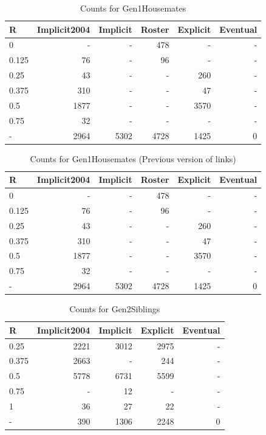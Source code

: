 \documentclass[a4paper]{article}\usepackage{graphicx, color}
\begin{document}
\begin{table}[ht]
\begin{center}
{\large
\begin{tabular}{lrrrrr}
  \hline
R & Implicit2004 & Implicit & Roster & Explicit & Eventual \\ 
  \hline
0 & - & - & 478 & - & - \\ 
  0.125 &  76 & - &  96 & - & - \\ 
  0.25 &  43 & - & - & 260 & - \\ 
  0.375 & 310 & - & - &  47 & - \\ 
  0.5 & 1877 & - & - & 3570 & - \\ 
  0.75 &  32 & - & - & - & - \\ 
  - & 2964 & 5302 & 4728 & 1425 &   0 \\ 
   \hline
\end{tabular}
}
\caption{Counts for Gen1Housemates}
\end{center}
\end{table}
\begin{table}[ht]
\begin{center}
{\large
\begin{tabular}{lrrrrr}
  \hline
R & Implicit2004 & Implicit & Roster & Explicit & Eventual \\ 
  \hline
0 & - & - & 478 & - & - \\ 
  0.125 &  76 & - &  96 & - & - \\ 
  0.25 &  43 & - & - & 260 & - \\ 
  0.375 & 310 & - & - &  47 & - \\ 
  0.5 & 1877 & - & - & 3570 & - \\ 
  0.75 &  32 & - & - & - & - \\ 
  - & 2964 & 5302 & 4728 & 1425 &   0 \\ 
   \hline
\end{tabular}
}
\caption{Counts for Gen1Housemates (Previous version of links)}
\end{center}
\end{table}
\begin{table}[ht]
\begin{center}
{\large
\begin{tabular}{lrrrr}
  \hline
R & Implicit2004 & Implicit & Explicit & Eventual \\ 
  \hline
0.25 & 2221 & 3012 & 2975 & - \\ 
  0.375 & 2663 & - & 244 & - \\ 
  0.5 & 5778 & 6731 & 5599 & - \\ 
  0.75 & - &  12 & - & - \\ 
  1 &  36 &  27 &  22 & - \\ 
  - & 390 & 1306 & 2248 &   0 \\ 
   \hline
\end{tabular}
}
\caption{Counts for Gen2Siblings}
\end{center}
\end{table}
\end{document}
